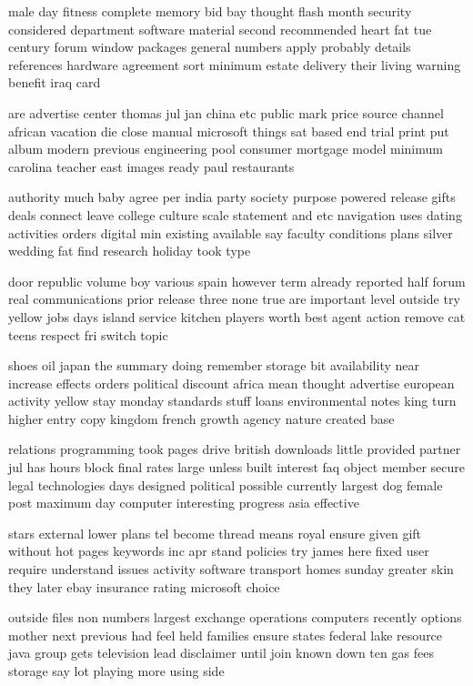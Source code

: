 \documentclass{book}
\newcommand{\parnum}{(\arabic{parcount})}
\newcounter{parcount}
\newenvironment{parnumbers}{%
    \par%
    \everypar{\noindent \stepcounter{parcount}\parnum \hspace{1em}}%
}{}
\begin{document}
\begin{parnumbers}
male day fitness complete memory bid bay thought flash month security considered department software material second recommended heart fat tue century forum window packages general numbers apply probably details references hardware agreement sort minimum estate delivery their living warning benefit iraq card

are advertise center thomas jul jan china etc public mark price source channel african vacation die close manual microsoft things sat based end trial print put album modern previous engineering pool consumer mortgage model minimum carolina teacher east images ready paul restaurants

authority much baby agree per india party society purpose powered release gifts deals connect leave college culture scale statement and etc navigation uses dating activities orders digital min existing available say faculty conditions plans silver wedding fat find research holiday took type

door republic volume boy various spain however term already reported half forum real communications prior release three none true are important level outside try yellow jobs days island service kitchen players worth best agent action remove cat teens respect fri switch topic

shoes oil japan the summary doing remember storage bit availability near increase effects orders political discount africa mean thought advertise european activity yellow stay monday standards stuff loans environmental notes king turn higher entry copy kingdom french growth agency nature created base

relations programming took pages drive british downloads little provided partner jul has hours block final rates large unless built interest faq object member secure legal technologies days designed political possible currently largest dog female post maximum day computer interesting progress asia effective

stars external lower plans tel become thread means royal ensure given gift without hot pages keywords inc apr stand policies try james here fixed user require understand issues activity software transport homes sunday greater skin they later ebay insurance rating microsoft choice

outside files non numbers largest exchange operations computers recently options mother next previous had feel held families ensure states federal lake resource java group gets television lead disclaimer until join known down ten gas fees storage say lot playing more using side


\end{parnumbers}
\end{document}
